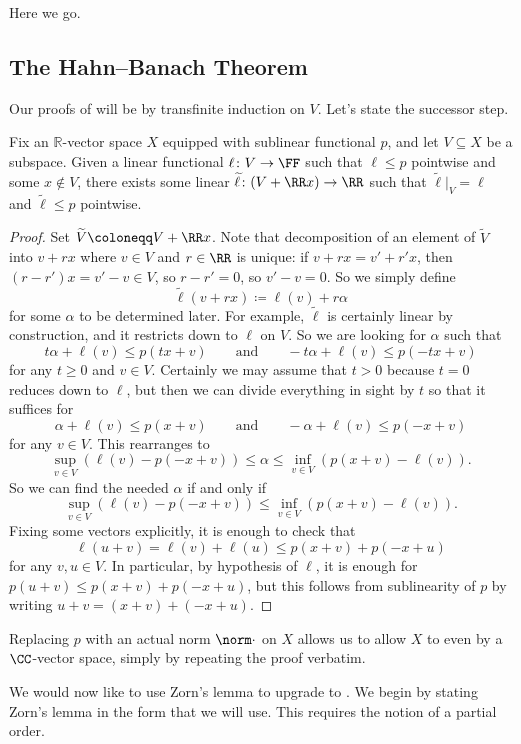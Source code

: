 \documentclass[../notes.tex]{subfiles}
\begin{document}
Here we go.

\subsection{The Hahn--Banach Theorem}
Our proofs of  will be by transfinite induction on $V$. Let's state the successor step.
\begin{lemma} \label{lem:hb-sub-step}
	Fix an $\mathbb R$-vector space $X$ equipped with sublinear functional $p$, and let $V\subseteq X$ be a subspace. Given a linear functional $\ell\colon V\to\FF$ such that $\ell\le p$ pointwise and some $x\notin V$, there exists some linear $\widetilde\ell\colon(V+\RR x)\to\RR$ such that $\widetilde\ell|_V=\ell$ and $\widetilde\ell\le p$ pointwise.
\end{lemma}
\begin{proof}
	Set $\widetilde V\coloneqq V+\RR x$. Note that decomposition of an element of $\widetilde V$ into $v+rx$ where $v\in V$ and $r\in\RR$ is unique: if $v+rx=v'+r'x$, then $(r-r')x=v'-v\in V$, so $r-r'=0$, so $v'-v=0$. So we simply define
	\[\widetilde\ell(v+rx)\coloneqq\ell(v)+r\alpha\]
	for some $\alpha$ to be determined later. For example, $\widetilde\ell$ is certainly linear by construction, and it restricts down to $\ell$ on $V$. So we are looking for $\alpha$ such that
	\[t\alpha+\ell(v)\le p(tx+v)\qquad\text{and}\qquad-t\alpha+\ell(v)\le p(-tx+v)\]
	for any $t\ge0$ and $v\in V$. Certainly we may assume that $t>0$ because $t=0$ reduces down to $\ell$, but then we can divide everything in sight by $t$ so that it suffices for
	\[\alpha+\ell(v)\le p(x+v)\qquad\text{and}\qquad-\alpha+\ell(v)\le p(-x+v)\]
	for any $v\in V$. This rearranges to
	\[\sup_{v\in V}(\ell(v)-p(-x+v))\le\alpha\le\inf_{v\in V}(p(x+v)-\ell(v)).\]
	So we can find the needed $\alpha$ if and only if
	\[\sup_{v\in V}(\ell(v)-p(-x+v))\le\inf_{v\in V}(p(x+v)-\ell(v)).\]
	Fixing some vectors explicitly, it is enough to check that
	\[\ell(u+v)=\ell(v)+\ell(u)\le p(x+v)+p(-x+u)\]
	for any $v,u\in V$. In particular, by hypothesis of $\ell$, it is enough for $p(u+v)\le p(x+v)+p(-x+u)$, but this follows from sublinearity of $p$ by writing $u+v=(x+v)+(-x+u)$.
\end{proof}
\begin{remark}
	Replacing $p$ with an actual norm $\norm\cdot$ on $X$ allows us to allow $X$ to even by a $\CC$-vector space, simply by repeating the proof verbatim.
\end{remark}
We would now like to use Zorn's lemma to upgrade  to . We begin by stating Zorn's lemma in the form that we will use. This requires the notion of a partial order.
\end{document}
